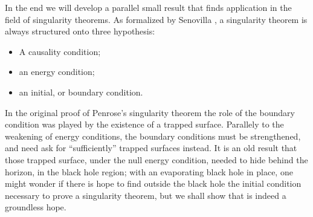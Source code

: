 In the end we will develop a parallel small result that finds application in the field of singularity theorems. As formalized by Senovilla \cite[]{senovilla1998singularity}, a singularity theorem is always structured onto three hypothesis:
\begin{itemize}
    \item[\ding{99}] A causality condition; 
    \item[\ding{99}] an energy condition;
    \item[\ding{99}] an initial, or boundary condition.
\end{itemize}
In the original proof of Penrose's singularity theorem the role of the boundary condition was played by the existence of a trapped surface. Parallely to the weakening of energy conditions, the boundary conditions must be strengthened, and need ask for ``sufficiently'' trapped surfaces instead. It is an old result that those trapped surface, under the null energy condition, needed to hide behind the horizon, in the black hole region; with an evaporating black hole in place, one might wonder if there is hope to find outside the black hole the initial condition necessary to prove a singularity theorem, but we shall show that is indeed a groundless hope.